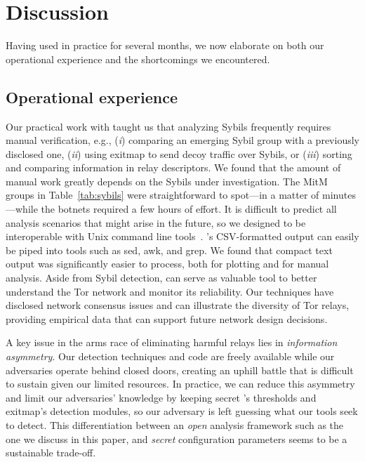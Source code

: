 \section{Discussion}
\label{sec:discussion}
Having used \sys in practice for several months, we now elaborate on both our
operational experience and the shortcomings we encountered.

\subsection{Operational experience}
\label{sec:operational}
Our practical work with \sys taught us that analyzing Sybils frequently
requires manual verification, e.g., (\emph{i}) comparing an emerging Sybil
group with a previously disclosed one, (\emph{ii}) using exitmap to send decoy
traffic over Sybils, or (\emph{iii}) sorting and comparing information in relay
descriptors.  We found that the amount of manual work greatly depends on the
Sybils under investigation.  The MitM groups in Table~\ref{tab:sybils} were
straightforward to spot---in a matter of minutes---while the botnets required a
few hours of effort.  It is difficult to predict all analysis scenarios that
might arise in the future, so we designed \sys to be interoperable with Unix
command line tools~\cite{Pike1983a}.  \Sys's CSV-formatted output can easily be
piped into tools such as sed, awk, and grep.  We found that compact text output
was significantly easier to process, both for plotting and for manual analysis.
Aside from Sybil detection, \sys can serve as valuable tool to better
understand the Tor network and monitor its reliability.  Our techniques have
disclosed network consensus issues and can illustrate the diversity of Tor
relays, providing empirical data that can support future network design
decisions.

A key issue in the arms race of eliminating harmful relays lies in
\emph{information asymmetry}.  Our detection techniques and code are freely
available while our adversaries operate behind closed doors, creating an uphill
battle that is difficult to sustain given our limited resources.  In practice,
we can reduce this asymmetry and limit our adversaries' knowledge by keeping
secret \sys's thresholds and exitmap's detection modules, so our adversary is
left guessing what our tools seek to detect.  This differentiation between an
\emph{open} analysis framework such as the one we discuss in this paper, and
\emph{secret} configuration parameters seems to be a sustainable trade-off.

